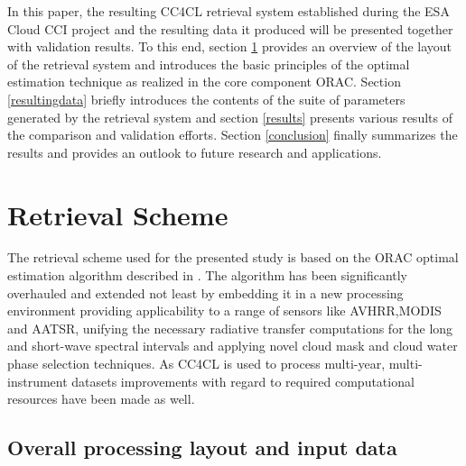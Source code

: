 \documentclass[amt]{style/copernicus}
\begin{document}
In this paper, the resulting CC4CL retrieval system established during the ESA Cloud CCI project and the resulting data it produced will be presented together with validation results. To this end, section \ref{retrievaloverview} provides an overview of the layout of the retrieval system and introduces the basic principles of the optimal estimation technique as realized in the core component ORAC. Section \ref{resultingdata} briefly introduces the contents of the suite of parameters generated by the retrieval system and section \ref{results} presents various results of the comparison and validation efforts. Section \ref{conclusion} finally summarizes the results and provides an outlook to future research and applications.



\section{Retrieval Scheme}\label{retrievaloverview}

The retrieval scheme used for the presented study is based on the ORAC optimal estimation algorithm described in \citet{Poulsen12}. The algorithm has been significantly overhauled and extended not least by embedding it in a new processing environment providing applicability to a range of sensors like AVHRR,MODIS and AATSR, unifying the necessary radiative transfer computations for the long and short-wave spectral intervals and applying  novel cloud mask and cloud water phase selection techniques. As CC4CL is used to process multi-year, multi-instrument datasets improvements with regard to required computational resources have been made as well.



\subsection{Overall processing layout and input data}\label{proclayout}
\end{document}
